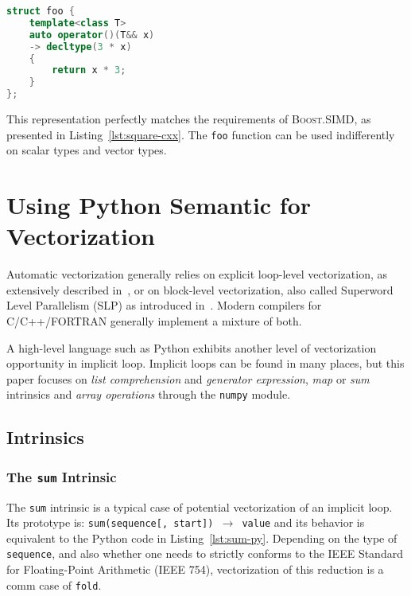 \documentclass[preprint]{sigplanconf}
\providecommand{\boostsimd}{\textsc{Boost.SIMD}}
\begin{document}
\begin{lstlisting}[language=c++, caption={Simplified Pythran Translation of a Polymorphic Function}, label={lst:simple-pythran-output}]
struct foo {
    template<class T>
    auto operator()(T&& x)
    -> decltype(3 * x)
    {
        return x * 3;
    }
};
\end{lstlisting}

This representation perfectly matches the requirements of \boostsimd, as
presented in Listing~\ref{lst:square-cxx}. The \texttt{foo} function can be
used indifferently on scalar types and vector types.


\section{Using Python Semantic for Vectorization}
\label{sec:python-semantic}

Automatic vectorization generally relies on explicit loop-level vectorization, as
extensively described in~\cite{bik04}, or on block-level vectorization, also
called Superword Level Parallelism (SLP) as introduced in~\cite{larsen00}.
Modern compilers for C/C++/FORTRAN generally implement a mixture of both.

A high-level language such as Python exhibits another level of vectorization
opportunity in implicit loop. Implicit loops can be found in many places, but
this paper focuses on \emph{list comprehension} and \emph{generator
expression}, \emph{map} or \emph{sum} intrinsics and \emph{array operations}
through the \texttt{numpy} module.

\subsection{Intrinsics}

\subsubsection{The \texttt{sum} Intrinsic}

The \texttt{sum} intrinsic is a typical case of potential vectorization of an
implicit loop. Its prototype is: \texttt{sum(sequence[, start]) $\rightarrow$
value} and its behavior is equivalent to the Python code in
Listing~\ref{lst:sum-py}. Depending on the type of \texttt{sequence}, and also
whether one needs to strictly conforms to the IEEE Standard for Floating-Point
Arithmetic (IEEE 754), vectorization of this reduction is a comm case of \texttt{fold}.
\end{document}
